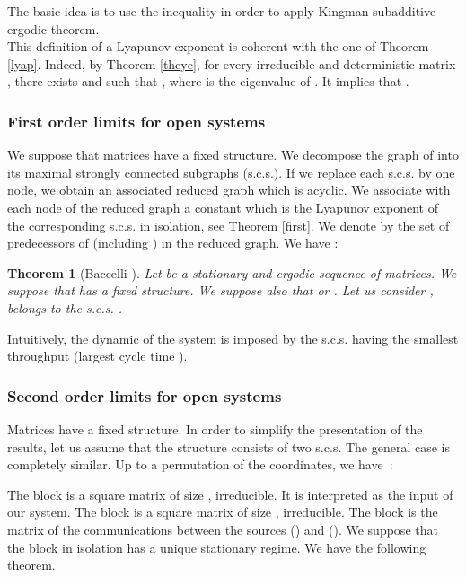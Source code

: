 \documentclass[11pt,titlepage]{article}
\newtheorem{theo}{Theorem }[section]
\begin{document}
The basic idea is to use the inequality  in order to apply 
Kingman subadditive ergodic theorem. \\

This definition of a  Lyapunov exponent is coherent with the one
of Theorem 
\ref{lyap}. Indeed, by Theorem \ref{thcyc}, for every irreducible and
deterministic matrix , there 
exists  and  such that , where  is the eigenvalue of .
It implies that .

\subsubsection{First order limits for open systems}

We suppose that matrices  have a fixed structure.
We decompose the graph of  
into its maximal strongly connected
subgraphs (s.c.s.). If we replace each s.c.s. by one node, we obtain an associated
reduced graph which is acyclic. We associate with each node  of the
reduced 
graph a constant  which is the Lyapunov exponent of the
corresponding s.c.s. in isolation, see Theorem \ref{first}. We denote
by  the
set of predecessors of  (including ) in the reduced
graph. We have :

\begin{theo}[Baccelli \protect\cite{bacc92}]
Let  be a stationary and ergodic sequence of 
matrices. We suppose that  has a fixed structure. We suppose also that
 or .  Let us
consider ,  belongs to the s.c.s. .

\label{first2}
\end{theo}

Intuitively, 
the dynamic of the system is imposed by the s.c.s.
having 
the smallest throughput (largest cycle time ).

\subsubsection{Second order limits for open systems}
Matrices  
have a fixed structure. In order to simplify the presentation of the
results, let us assume that the structure consists of two s.c.s. The general
case is completely similar. Up to a permutation of the coordinates, we have~:

The block  is a square matrix of size , irreducible. It
is interpreted as the input 
of our system. The block  is a square matrix of size  , irreducible. The block  is the matrix of the
communications between the sources () and 
(). We suppose that the block 
 in isolation has a unique stationary regime.
We have the following theorem.
\end{document}
